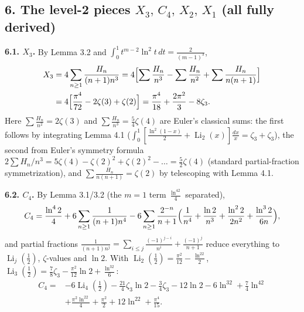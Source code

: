 \documentclass[11pt]{article}
\theoremstyle{remark}
\begin{document}
\subsection*{6. The level-2 pieces $X_3,\,C_4,\,X_2,\,X_1$ (all fully derived)}

\textbf{6.1. $X_3$.} By Lemma 3.2 and $\int_0^1t^{m-2}\ln^2t\,dt=\frac{2}{(m-1)^3}$,
\[
\begin{aligned}
X_3&=4\sum_{n\ge1}\frac{H_n}{(n+1)n^3}
=4\Bigl[\sum\frac{H_n}{n^3}-\sum\frac{H_n}{n^2}+\sum\frac{H_n}{n(n+1)}\Bigr]\\
&=4\Bigl[\frac{\pi^4}{72}-2\zeta(3)+\zeta(2)\Bigr]
=\frac{\pi^4}{18}+\frac{2\pi^2}{3}-8\zeta_3 .
\end{aligned}
\]
Here $\sum\frac{H_n}{n^2}=2\zeta(3)$ and $\sum\frac{H_n}{n^3}=\frac54\zeta(4)$ are Euler's classical sums: the first follows by integrating Lemma 4.1 ($\int_0^1[\frac{\ln^2(1-x)}2+\operatorname{Li}_2(x)]\frac{dx}{x}=\zeta_3+\zeta_3$), the second from Euler's symmetry formula $2\sum H_n/n^3=5\zeta(4)-\zeta(2)^2+\zeta(2)^2-\dots=\tfrac52\zeta(4)$ (standard partial-fraction symmetrization), and $\sum\frac{H_n}{n(n+1)}=\zeta(2)$ by telescoping with Lemma 4.1.

\textbf{6.2. $C_4$.} By Lemma 3.1/3.2 (the $m=1$ term $\tfrac{\ln^42}{4}$ separated),
\[
C_4=\frac{\ln^42}{4}+6\sum_{n\ge1}\frac{1}{(n+1)n^4}
-6\sum_{n\ge1}\frac{2^{-n}}{n+1}\Bigl(\frac1{n^4}+\frac{\ln2}{n^3}+\frac{\ln^22}{2n^2}+\frac{\ln^32}{6n}\Bigr),
\]
and partial fractions $\frac1{(n+1)n^j}=\sum_{i\le j}\frac{(-1)^{j-i}}{n^i}+\frac{(-1)^j}{n+1}$ reduce everything to $\operatorname{Li}_j(\tfrac12)$, $\zeta$-values and $\ln 2$. With $\operatorname{Li}_2(\tfrac12)=\tfrac{\pi^2}{12}-\tfrac{\ln^22}2$, $\operatorname{Li}_3(\tfrac12)=\tfrac78\zeta_3-\tfrac{\pi^2}{12}\ln2+\tfrac{\ln^32}6$:
\[
\begin{aligned}
C_4={}&-6\operatorname{Li}_4(\tfrac12)-\frac{21}{4}\zeta_3\ln2-\frac34\zeta_3-12\ln2-6\ln^32+\frac74\ln^42\\
&+\frac{\pi^2\ln^22}{4}+\frac{\pi^2}{2}+12\ln^22+\frac{\pi^4}{15}.
\end{aligned}
\]
\end{document}
